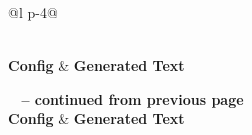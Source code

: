{\scriptsize
\begin{longtable}{@{}l p{\dimexpr\textwidth-3cm-4\tabcolsep}@{}}
\caption[Text Generation Examples]{Sample answers generated by selected model configurations.} \label{tab:generated_answers} \\
\hline
\textbf{Config} & \textbf{Generated Text} \\
\hline
\endfirsthead

%
{{\footnotesize \bfseries \tablename\ \thetable{} -- continued from previous page}} \\
\hline
\textbf{Config} & \textbf{Generated Text} \\
\hline
\endhead

\hline {} \\
\endfoot


\end{longtable}}
